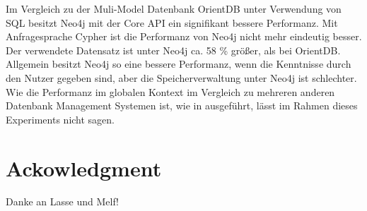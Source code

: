 Im Vergleich zu der Muli-Model Datenbank OrientDB unter Verwendung von SQL besitzt Neo4j mit der Core API ein signifikant bessere Performanz. Mit  Anfragesprache Cypher ist die Performanz von Neo4j nicht mehr eindeutig besser. Der verwendete Datensatz ist unter Neo4j ca. 58 \% größer, als bei OrientDB. Allgemein besitzt Neo4j so eine bessere Performanz, wenn die Kenntnisse durch den Nutzer gegeben sind, aber die Speicherverwaltung unter Neo4j ist schlechter. Wie die Performanz im globalen Kontext im Vergleich zu mehreren anderen Datenbank Management Systemen ist, wie in \parencite{jouili2013empirical} ausgeführt,  lässt im Rahmen dieses Experiments nicht sagen.  \newline
\section{Ackowledgment}
Danke an Lasse und Melf!
